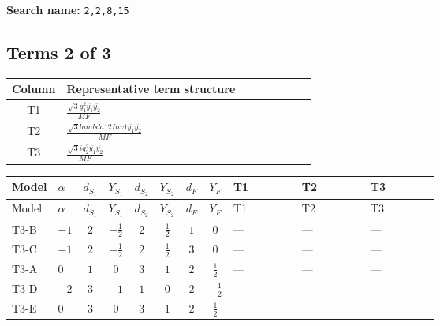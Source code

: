 \documentclass[8pt]{article}
\begin{document}
\begin{landscape}
\begin{longtable}{@{}llcccccc >{\raggedright\arraybackslash}p{0.21\linewidth} >{\raggedright\arraybackslash}p{0.21\linewidth} >{\raggedright\arraybackslash}p{0.21\linewidth}@{}}
\midrule
\bottomrule
\end{longtable}
\clearpage
\noindent\textbf{Search name: }\texttt{2,2,8,15}\par\smallskip
\subsection*{Terms 2 of 3}
\begin{center}
\begin{tabular}{@{}c >{\raggedright\arraybackslash}p{0.82\linewidth}@{}}
\toprule
Column & Representative term structure \\
\midrule
T1 & \(\displaystyle \frac{\sqrt{3} g_{1}^{2} \overline{y_{1}} \overline{y_{2}}}{MF}\) \\
\midrule
T2 & \(\displaystyle \frac{\sqrt{3} lambda12Inv1 \overline{y_{1}} \overline{y_{2}}}{MF}\) \\
\midrule
T3 & \(\displaystyle \frac{\sqrt{3} i g_{2}^{2} \overline{y_{1}} \overline{y_{2}}}{MF}\) \\
\midrule
\bottomrule
\end{tabular}
\end{center}
\smallskip
\tiny
\begin{longtable}{@{}llcccccc >{\raggedright\arraybackslash}p{0.21\linewidth} >{\raggedright\arraybackslash}p{0.21\linewidth} >{\raggedright\arraybackslash}p{0.21\linewidth}@{}}
\toprule
Model & $\alpha$ & $d_{S_1}$ & $Y_{S_1}$ & $d_{S_2}$ & $Y_{S_2}$ & $d_F$ & $Y_F$ & T1 & T2 & T3 \\
\midrule
\endfirsthead
\toprule
Model & $\alpha$ & $d_{S_1}$ & $Y_{S_1}$ & $d_{S_2}$ & $Y_{S_2}$ & $d_F$ & $Y_F$ & T1 & T2 & T3 \\
\midrule
\endhead
T3-B & $-1$ & $2$ & $-\frac{1}{2}$ & $2$ & $\frac{1}{2}$ & $1$ & $0$ & --- & --- & --- \\
\midrule
T3-C & $-1$ & $2$ & $-\frac{1}{2}$ & $2$ & $\frac{1}{2}$ & $3$ & $0$ & --- & --- & --- \\
\midrule
T3-A & $0$ & $1$ & $0$ & $3$ & $1$ & $2$ & $\frac{1}{2}$ & --- & --- & --- \\
\midrule
T3-D & $-2$ & $3$ & $-1$ & $1$ & $0$ & $2$ & $-\frac{1}{2}$ & --- & --- & --- \\
\midrule
T3-E & $0$ & $3$ & $0$ & $3$ & $1$ & $2$ & $\frac{1}{2}$ & \scriptsize\adjustbox{max width=\linewidth}{$\begin{gathered} - \frac{\sqrt{3} g_{1}^{2} \overline{y_{1}} \overline{y_{2}}}{8 MF}\end{gathered}$} & \scriptsize\adjustbox{max width=\linewidth}{$\begin{gathered} \frac{\sqrt{3} lambda12Inv1 \overline{y_{1}} \overline{y_{2}}}{6 MF}\end{gathered}$} & \scriptsize\adjustbox{max width=\linewidth}{$\begin{gathered} - \frac{\sqrt{3} i g_{2}^{2} \overline{y_{1}} \overline{y_{2}}}{6 MF}\end{gathered}$} \\

\end{longtable}
\end{landscape}
\end{document}
